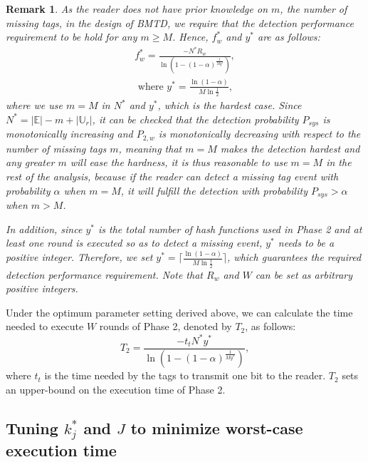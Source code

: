 \documentclass[10pt, twocolumn]{IEEEtran}
\newtheorem*{remark}{Remark}
\begin{document}
\begin{remark}

As the reader does not have prior knowledge on $m$, the number of missing tags, in the design of BMTD, we require that the detection performance requirement to be hold for any $m\ge M$. Hence, $f_w^*$ and $y^*$ are as follows:
\begin{eqnarray}
f_w^* = \frac{-N^* R_w}{\ln (1- (1-\alpha)^{\frac{1}{M y^*}})} \label{Eq:f_w_op}, \\
\text{ where } y^*= \frac{\ln (1-\alpha)}{M \ln \frac{1}{2}} \label{Eq:y_op},
\end{eqnarray}
where we use $m=M$ in $N^*$ and $y^*$, which is the hardest case.
Since $N^* = |\mathbb{E}|-m+ |\mathbb{U}_r|$, it can be checked that the detection probability $P_{sys}$ is monotonically increasing and $P_{2,w}$ is monotonically decreasing with respect to the number of missing tags $m$, meaning that $m=M$ makes the detection hardest and any greater $m$ will ease the hardness, it is thus reasonable to use $m=M$ in the rest of the analysis, because if the reader can detect a missing tag event with probability $\alpha$ when $m=M$, it will fulfill the detection with probability $P_{sys}>\alpha$ when $m>M$.

In addition, since $y^*$ is the total number of hash functions used in Phase 2 and at least one round is executed so as to detect a missing event, $y^*$ needs to be a positive integer. Therefore, we set $y^*$$=$$\lceil\frac{\ln (1-\alpha)}{M \ln \frac{1}{2}}\rceil$, which guarantees the required detection performance requirement.
Note that $R_w$ and $W$ can be set as arbitrary positive integers.
\end{remark}

Under the optimum parameter setting derived above, we can calculate the time needed to execute $W$ rounds of Phase 2, denoted by $T_2$, as follows:
\begin{equation}
T_2 = \frac{-t_t N^* y^*}{\ln (1- (1-\alpha)^{\frac{1}{M y^*}})},
\end{equation}
where $t_t$ is the time needed by the tags to transmit one bit to the reader. $T_2$ sets an upper-bound on the execution time of Phase 2.



\subsection{Tuning $k_j^*$ and $J$ to minimize worst-case execution time}
\label{sec:parameter_global}
\end{document}
